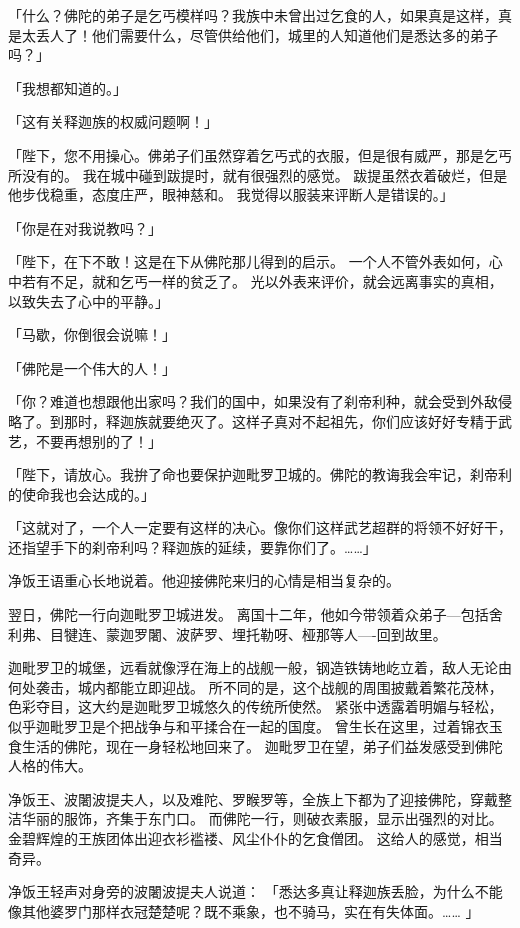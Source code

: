 \documentclass[twoside,openany]{book}
\begin{document}
「什么？佛陀的弟子是乞丐模样吗？我族中未曾出过乞食的人，如果真是这样，真是太丢人了！他们需要什么，尽管供给他们，城里的人知道他们是悉达多的弟子吗？」

「我想都知道的。」

「这有关释迦族的权威问题啊！」

「陛下，您不用操心。佛弟子们虽然穿着乞丐式的衣服，但是很有威严，那是乞丐所没有的。
我在城中碰到跋提时，就有很强烈的感觉。
跋提虽然衣着破烂，但是他步伐稳重，态度庄严，眼神慈和。
我觉得以服装来评断人是错误的。」

「你是在对我说教吗？」

「陛下，在下不敢！这是在下从佛陀那儿得到的启示。
一个人不管外表如何，心中若有不足，就和乞丐一样的贫乏了。
光以外表来评价，就会远离事实的真相，以致失去了心中的平静。」

「马歇，你倒很会说嘛！」

「佛陀是一个伟大的人！」

「你？难道也想跟他出家吗？我们的国中，如果没有了刹帝利种，就会受到外敌侵略了。到那时，释迦族就要绝灭了。这样子真对不起祖先，你们应该好好专精于武艺，不要再想别的了！」

「陛下，请放心。我拚了命也要保护迦毗罗卫城的。佛陀的教诲我会牢记，刹帝利的使命我也会达成的。」

「这就对了，一个人一定要有这样的决心。像你们这样武艺超群的将领不好好干，还指望手下的刹帝利吗？释迦族的延续，要靠你们了。……」

净饭王语重心长地说着。他迎接佛陀来归的心情是相当复杂的。

翌日，佛陀一行向迦毗罗卫城进发。
离国十二年，他如今带领着众弟子---包括舍利弗、目犍连、蒙迦罗闍、波萨罗、埋托勒呀、桠那等人----回到故里。

迦毗罗卫的城堡，远看就像浮在海上的战舰一般，钢造铁铸地屹立着，敌人无论由何处袭击，城内都能立即迎战。
所不同的是，这个战舰的周围披戴着繁花茂林，色彩夺目，这大约是迦毗罗卫城悠久的传统所使然。
紧张中透露着明媚与轻松，似乎迦毗罗卫是个把战争与和平揉合在一起的国度。
曾生长在这里，过着锦衣玉食生活的佛陀，现在一身轻松地回来了。
迦毗罗卫在望，弟子们益发感受到佛陀人格的伟大。

净饭王、波闍波提夫人，以及难陀、罗睺罗等，全族上下都为了迎接佛陀，穿戴整洁华丽的服饰，齐集于东门口。
而佛陀一行，则破衣素服，显示出强烈的对比。
金碧辉煌的王族团体出迎衣衫褴褛、风尘仆仆的乞食僧团。
这给人的感觉，相当奇异。

净饭王轻声对身旁的波闍波提夫人说道：
「悉达多真让释迦族丢脸，为什么不能像其他婆罗门那样衣冠楚楚呢？既不乘象，也不骑马，实在有失体面。……	」
\end{document}
